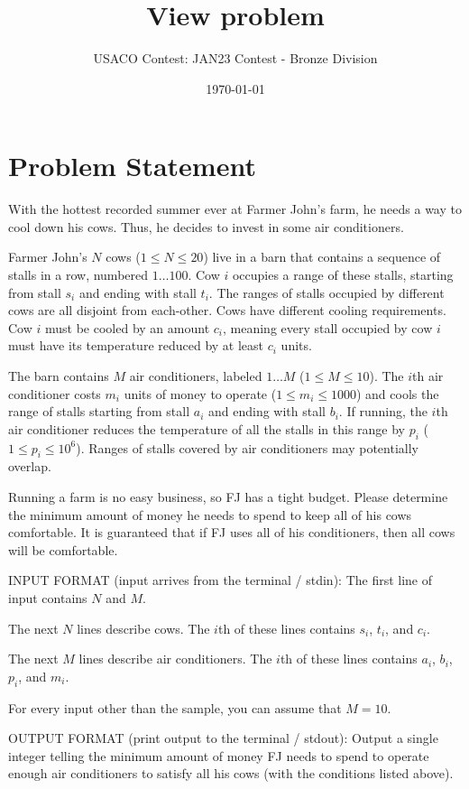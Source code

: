 \documentclass[12pt]{article}
\title{View problem}
\author{USACO Contest: JAN23 Contest - Bronze Division}
\date{\today}
\begin{document}
\maketitle

\section*{Problem Statement}


With the hottest recorded summer ever at Farmer John's farm, he needs a way to
cool down his cows. Thus, he decides to invest in some air conditioners. 

Farmer John's $N$ cows ($1 \leq N \leq 20$) live in a barn that contains a 
sequence of stalls in a row, numbered $1 \ldots 100$.  Cow $i$ occupies a range
of  these stalls, starting from stall $s_i$ and ending with stall $t_i$.  The
ranges of stalls occupied by different cows are all disjoint from each-other. 
Cows have different cooling requirements.  Cow $i$ must be cooled by an amount
$c_i$, meaning every stall occupied by cow $i$ must have its temperature reduced
by at least $c_i$ units.

The barn contains $M$ air conditioners, labeled $1 \ldots M$
($1 \leq M \leq 10$). The $i$th air conditioner costs $m_i$ units of money to
operate ($1 \leq m_i \leq 1000$) and cools the range of stalls starting from
stall $a_i$ and ending with stall $b_i$.  If running, the $i$th air conditioner
reduces the temperature of all the stalls in this range by $p_i$
($1 \leq p_i \leq 10^6$).  Ranges of stalls covered by air conditioners may
potentially overlap.

Running a farm is no easy business, so FJ has a tight budget. Please determine
the minimum amount of money he needs to spend to keep all of his cows
comfortable. It is guaranteed that if FJ uses all of his conditioners, then all
cows will be comfortable.

INPUT FORMAT (input arrives from the terminal / stdin):
The first line of input contains $N$ and $M$.

The next $N$ lines describe cows.  The $i$th of these lines contains $s_i$,
$t_i$, and $c_i$.

The next $M$ lines describe air conditioners.  The $i$th of these lines contains
$a_i$, $b_i$, $p_i$, and $m_i$.

For every input other than the sample, you can assume that $M = 10$.


OUTPUT FORMAT (print output to the terminal / stdout):
Output a single integer telling the minimum amount of money FJ needs to spend to
operate enough air conditioners to satisfy all his cows (with the conditions
listed above). 
\end{document}

